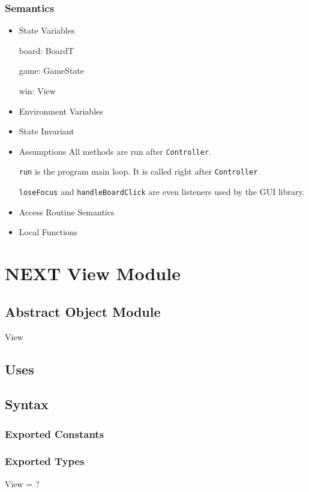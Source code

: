 \documentclass[11pt]{article}
\begin{document}
\subsubsection*{Semantics}
\label{sec:org17ac65b}
\begin{itemize}
\item State Variables
\label{sec:org318c29a}

board: BoardT

game: GameState

win: View

\item Environment Variables
\label{sec:orgff28d91}
\item State Invariant
\label{sec:orga5c8485}
\item Assumptions
\label{sec:org87c9471}
All methods are run after \texttt{Controller}.

\texttt{run} is the program main loop. It is called right after \texttt{Controller}

\texttt{loseFocus} and \texttt{handleBoardClick} are even listeners used by the GUI library.

\item Access Routine Semantics
\label{sec:orgd876730}
\item Local Functions
\label{sec:orge9b3482}


\newpage
\end{itemize}
\section{{\bfseries\sffamily NEXT} View Module}
\label{sec:org827f7aa}
\subsection*{Abstract Object Module}
\label{sec:orgf2401ff}
View
\subsection*{Uses}
\label{sec:org3d6ea8e}

\subsection*{Syntax}
\label{sec:org08c8cbb}
\subsubsection*{Exported Constants}
\label{sec:org5dcbd1c}
\subsubsection*{Exported Types}
\label{sec:orga63a7dd}
View = ?
\end{document}
